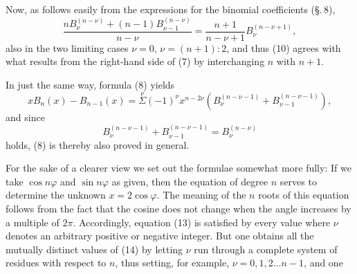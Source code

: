 Now, as follows easily from the expressions for the binomial coefficients (\S.\,8),
\[
\dfrac{n B_\nu^{(n-\nu)} + (n-1) B_{\nu-1}^{(n-\nu)}}{n-\nu} = \dfrac{n+1}{n-\nu+1} B_\nu^{(n-\nu+1)},
\]
also in the two limiting cases $\nu=0$, $\nu=(n+1):2$, and thus (10) agrees with what results from the right-hand side of (7) by interchanging $n$ with $n+1$.

In just the same way, formula (8) yields
\[
x B_n(x) - B_{n-1}(x) = \overset{\nu}{\Sigma}(-1)^\nu x^{n-2\nu}\left(B_\nu^{(n-\nu-1)} + B_{\nu-1}^{(n-\nu-1)}\right),
\]
and since
\[
B_\nu^{(n-\nu-1)} + B_{\nu-1}^{(n-\nu-1)} = B_\nu^{(n-\nu)}
\]
holds, (8) is thereby also proved in general.

For the sake of a clearer view we set out the formulae somewhat more fully:
If we take $\cos n\varphi$ and $\sin n\varphi$ as given, then the equation of degree $n$
serves to determine the unknown $x = 2\cos\varphi$. The meaning of the $n$ roots of this equation follows from the fact that the cosine does not change when the angle increases by a multiple of $2\pi$. Accordingly, equation (13) is satisfied by every value
where $\nu$ denotes an arbitrary positive or negative integer. But one obtains all the mutually distinct values of (14) by letting $\nu$ run through a complete system of residues with respect to $n$, thus setting, for example, $\nu = 0, 1, 2 \ldots n-1$, and one
